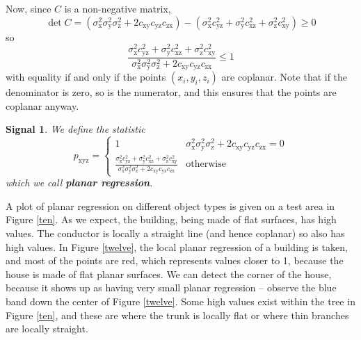 \documentclass[a4paper,11pt,twoside]{article}
\newtheorem*{signals}{Signal}
\theoremstyle{definition}
\theoremstyle{remark}
\newcommand{\x}{\mathrm{x}}
\newcommand{\y}{\mathrm{y}}
\newcommand{\z}{\mathrm{z}}
\newenvironment{sigs}
   {\colorlet{shadecolor}{green!50}\begin{shaded}\begin{signals}}
   {\end{signals}\end{shaded}}
\begin{document}
Now, since $C$ is a non-negative matrix,
\begin{displaymath}
\det C = (\sigma_\x^2\sigma_\y^2\sigma_\z^2+2c_{\x\y}c_{\y\z}c_{\z\x})-(\sigma_\x^2c_{\y\z}^2+\sigma_\y^2c_{\x\z}^2+\sigma_\z^2c_{\x\y}^2)\geqslant 0
\end{displaymath}
so 
\begin{displaymath}
\frac{\sigma_\x^2c_{\y\z}^2+\sigma_\y^2c_{\x\z}^2+\sigma_\z^2c_{\x\y}^2}{\sigma_\x^2\sigma_\y^2\sigma_\z^2+2c_{\x\y}c_{\y\z}c_{\z\x}}\leqslant 1
\end{displaymath}
with equality if and only if the points $(x_i,y_i,z_i)$ are coplanar. Note that if the denominator is zero, so is the numerator, and this ensures that the points are coplanar anyway.
\begin{sigs}
We define the statistic
\begin{displaymath}
p_{\x\y\z}=\begin{cases}1&\sigma_\x^2\sigma_\y^2\sigma_\z^2+2c_{\x\y}c_{\y\z}c_{\z\x}=0\\
{\displaystyle \frac{\sigma_\x^2c_{\y\z}^2+\sigma_\y^2c_{\x\z}^2+\sigma_\z^2c_{\x\y}^2}{\sigma_\x^2\sigma_\y^2\sigma_\z^2+2c_{\x\y}c_{\y\z}c_{\z\x}}}&\text{otherwise}
\end{cases}
\end{displaymath}
which we call \textbf{planar regression}.
\end{sigs}

A plot of planar regression on different object types is given on a test area in Figure \hyperref[ten]{\ref*{ten}}. As we expect, the building, being made of flat surfaces, has high values. The conductor is locally a straight line (and hence coplanar) so also has high values. In Figure \hyperref[twelve]{\ref*{twelve}}, the local planar regression of a building is taken, and most of the points are red, which represents values closer to 1, because the house is made of flat planar surfaces. We can detect the corner of the house, because it shows up as having very small planar regression -- observe the blue band down the center of Figure \hyperref[twelve]{\ref*{twelve}}. Some high values exist within the tree in Figure \hyperref[ten]{\ref*{ten}}, and these are where the trunk is locally flat or where thin branches are locally straight.
\end{document}
